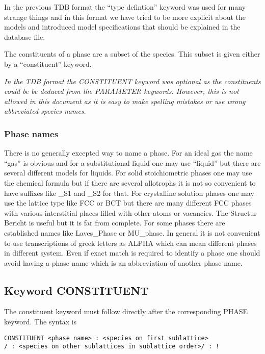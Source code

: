 \documentclass[12pt]{article}
\begin{document}
In the previous TDB format the ``type defintion'' keyword was used for
many strange things and in this format we have tried to be more
explicit about the models and introduced model specifications that
should be explained in the database file.

The constituents of a phase are a subset of the species.  This subset
is given either by a ``constituent'' keyword.

{\em In the TDB format the CONSTITUENT keyword was optional as the
  constituents could be be deduced from the PARAMETER keywords.
  However, this is not allowed in this document as it is easy to make
  spelling mistakes or use wrong abbreviated species names.}

\subsubsection{Phase names}\label{sec:phnames}

There is no generally excepted way to name a phase.  For an ideal gas
the name ``gas'' is obvious and for a substitutional liquid one may
use ``liquid'' but there are several different models for liquids.
For solid stoichiometric phases one may use the chemical formula but
if there are several allotrophs it is not so convenient to have
suffixes like \_S1 and \_S2 for that.  For crystalline solution phases
one may use the lattice type like FCC or BCT but there are many
different FCC phases with various interstitial places filled with
other atoms or vacancies.  The Structur Bericht is useful but it is
far from complete.  For some phases there are established names like
Laves\_Phase or MU\_phase.  In general it is not convenient to use
transcriptions of greek letters as ALPHA which can mean different
phases in different system.  Even if exact match is required to identify
a phase one should avoid having a phase name which is an abbreviation
of another phase name.


\subsection{Keyword CONSTITUENT}\label{sec:const}

The constituent keyword must follow directly after the corresponding
PHASE keyword.  The syntax is

\begin{verbatim}
CONSTITUENT <phase name> : <species on first sublattice> 
/ : <species on other sublattices in sublattice order>/ : !
\end{verbatim}
\end{document}
